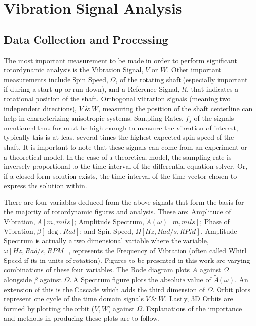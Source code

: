 \chapter{Vibration Signal Analysis}\label{VibrationSignalAnalysis}
\section{Data Collection and Processing}
The most important measurement to be made in order to perform significant rotordynamic analysis is the Vibration Signal, $ V $ or $ W $. Other important measurements include Spin Speed, $ \Omega $, of the rotating shaft (especially important if during a start-up or run-down), and a Reference Signal, $ R $, that indicates a rotational position of the shaft. Orthogonal vibration signals (meaning two independent directions), $ V\ \&\ W $, measuring the position of the shaft centerline can help in characterizing anisotropic systems. Sampling Rates, $ f_s $ of the signals mentioned thus far must be high enough to measure the vibration of interest, typically this is at least several times the highest expected spin speed of the shaft. It is important to note that these signals can come from an experiment or a theoretical model. In the case of a theoretical model, the sampling rate is inversely proportional to the time interval of the differential equation solver. Or, if a closed form solution exists, the time interval of the time vector chosen to express the solution within.\par
There are four variables deduced from the above signals that form the basis for the majority of rotordynamic figures and analysis. These are: Amplitude of Vibration, $ A[m,mils] $; Amplitude Spectrum, $ \tilde{A}(\omega)[m,mils] $; Phase of Vibration, $ \beta[\deg,Rad] $; and Spin Speed, $ \Omega[Hz,Rad/s,RPM] $. Amplitude Spectrum is actually a two dimensional variable where the variable, $ \omega[Hz,Rad/s,RPM] $, represents the Frequency of Vibration (often called Whirl Speed if its in units of rotation). Figures to be presented in this work are varying combinations of these four variables. The Bode diagram plots $ A $ against $ \Omega $ alongside $ \beta $  against $ \Omega $. A Spectrum figure plots the absolute value of $ \tilde{A}(\omega) $. An extension of this is the Cascade which adds the third dimension of $ \Omega $. Orbit plots represent one cycle of the time domain signals $ V\ \&\ W $. Lastly, 3D Orbits are formed by plotting the orbit ($ V,W $) against $ \Omega $. Explanations of the importance and methods in producing these plots are to follow. \par
